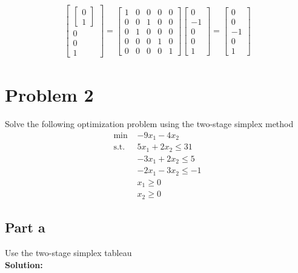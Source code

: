 \documentclass[11pt]{article}
\begin{document}
\begin{enumerate}
\begin{align*}
\begin{bmatrix}
        \begin{bmatrix}
            0 \\ 1
        \end{bmatrix} \\
        0 \\ 0 \\ 1
      \end{bmatrix}
      = 
      \begin{bmatrix}
        1 & 0 & 0 & 0 & 0 \\
        0 & 0 & 1 & 0 & 0 \\
        0 & 1 & 0 & 0 & 0 \\
        0 & 0 & 0 & 1 & 0 \\
        0 & 0 & 0 & 0 & 1
      \end{bmatrix}
      \begin{bmatrix}
        0 \\ -1 \\ 0 \\ 0 \\ 1
      \end{bmatrix}
      =
      \begin{bmatrix}
        0 \\ 0 \\ -1 \\ 0 \\ 1 
      \end{bmatrix}
    \end{align*}
\end{enumerate}

\section{Problem 2}
Solve the following optimization problem using the two-stage simplex method
\[
\begin{aligned}
\text{min } & -9x_1 - 4x_2 \\
\text{s.t. } & 5x_1 + 2x_2 \leq 31 \\
& -3x_1 + 2x_2 \leq 5 \\
& -2x_1 - 3x_2 \leq -1 \\
& x_1 \geq 0 \\
& x_2 \geq 0
\end{aligned}
\]

\subsection{Part a}
Use the two-stage simplex tableau
\\
\textbf{Solution: }
\end{document}
